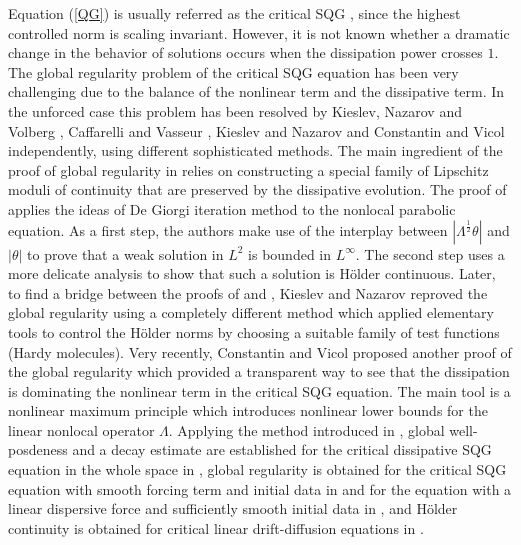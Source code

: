 \documentclass{amsart}
\numberwithin{Theorem}{section}
\theoremstyle{definition}
\theoremstyle{remark}
\begin{document}
Equation (\ref{QG}) is usually referred as the critical SQG \cite{CMT}, since the highest controlled norm is scaling invariant. However, it is not known whether a dramatic change in the behavior of solutions occurs when the dissipation power crosses $1$. The global regularity problem of the critical SQG equation has been very challenging due to the balance of the nonlinear term and the dissipative term. In the unforced case this problem has been resolved by Kieslev, Nazarov and Volberg \cite{KNV}, Caffarelli and Vasseur \cite{CaV}, Kieslev and Nazarov \cite{KN09} and Constantin and Vicol \cite{CV} independently, using different sophisticated methods. The main ingredient of the proof of global regularity in \cite{KNV} relies on constructing a special family of Lipschitz moduli of continuity that are preserved by the dissipative evolution. The proof of \cite{CaV} applies the ideas of De Giorgi iteration method to the nonlocal parabolic equation. As a first step, the authors make use of the interplay between $|\Lambda ^{\frac 12}\theta|$ and $|\theta|$ to prove that a weak solution in $L^2$ is bounded in $L^\infty$. The second step uses a more delicate analysis to show that such a solution is H\"older continuous. Later, to find a bridge between the proofs of \cite{KNV} and \cite{CaV}, Kieslev and Nazarov \cite{KN09} reproved the global regularity using a completely different method which applied elementary tools to control the H\"older norms by choosing a suitable family of test functions (Hardy molecules). Very recently, Constantin and 
Vicol \cite{CV} proposed another proof of the global regularity which provided a transparent way to see that the dissipation is dominating the nonlinear term in the critical SQG equation. The main tool is a nonlinear maximum principle which introduces nonlinear lower bounds for the linear nonlocal operator $\Lambda$.
Applying the method introduced in \cite{KNV}, global well-posdeness and a decay estimate are established for the critical dissipative SQG equation in the whole space in \cite{DD}, global regularity is obtained for the critical SQG equation with smooth forcing term and initial data in \cite{FPV} and for the equation with a linear dispersive force and sufficiently smooth initial data in \cite{KN10}, 
and H\"older continuity is obtained for critical linear drift-diffusion equations in \cite{SV}.
\end{document}
